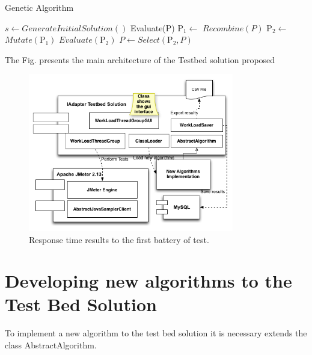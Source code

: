 \documentclass[review]{elsarticle}
\begin{document}
\begin{algorithm}[H]
  \caption{Genetic Algorithm}\label{gna}
  \begin{algorithmic}[3]
    
    \State $s\gets GenerateInitialSolution()$
    \State Evaluate(P)
    \State $\mbox{P}_1\gets$ $Recombine(P)$
    \State $\mbox{P}_2\gets$ $Mutate(\mbox{P}_1)$ 
    \State $Evaluate(\mbox{P}_2)$
    \State $P\gets Select(\mbox{P}_2,P)$
    \EndWhile
      
  \end{algorithmic}
\end{algorithm}




The Fig. presents the main architecture of the Testbed solution proposed 

\begin{figure}[H]
\centering
\includegraphics[width=0.8\textwidth]{./images/mainarchitect.png}
\caption{Response time results to the first battery of test.}
\label{fig:responsetimetest1}
\end{figure}

\section{Developing new algorithms to the Test Bed Solution}

To implement a new algorithm to the test bed solution it is necessary extends the class AbstractAlgorithm.

\end{document}
